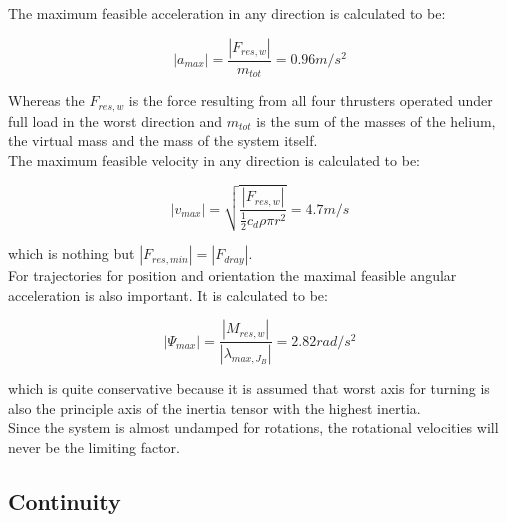 The maximum feasible acceleration in any direction is calculated to be:

\begin{equation}
  \left|a_{max} \right| =  \frac{\left|F_{res, w}\right|}{m_{tot}} = 0.96 m/s^2
\end{equation}

Whereas the $F_{res,w}$ is the force resulting from all four thrusters operated under full load in the worst direction and $m_{tot}$ is the sum of the masses of the helium, the virtual mass and the mass of the system itself.\\


The maximum feasible velocity in any direction is calculated to be:

\begin{equation}
\left|v_{max} \right| = \sqrt{\frac{\left|F_{res,w} \right|}{\frac{1}{2}c_d \rho \pi r^2}}=4.7 m/s
\end{equation}

which is nothing but $ \left|F_{res,min} \right| = \left|F_{dray} \right| $.\\

For trajectories for position and orientation the maximal feasible angular acceleration is also important. It is calculated to be:

\begin{equation}
  \left|\Psi_{max} \right| =  \frac{\left|M_{res,w}\right|}{\left| \lambda_{max, J_{B}} \right|} = 2.82 rad/s^2 
\end{equation}

which is quite conservative because it is assumed that worst axis for turning is also the principle axis of the inertia tensor with the highest inertia.\\

Since the system is almost undamped for rotations, the rotational velocities will never be the limiting factor.





\subsection{Continuity}







